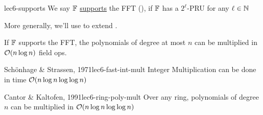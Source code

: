 \begin{definition}{}{lec6-supports}
    We say $\operatorname{\mathbb{F}}$ \ul{supports} the FFT (), if $\operatorname{\mathbb{F}}$ has a $2^\ell$-PRU for any $\ell \in \operatorname{\mathbb{N}}$
\end{definition}

More generally, we'll use  to extend .
\begin{theorem}{}{}
    If $\operatorname{\mathbb{F}}$ supports the FFT, the polynomials of degree at most $n$ can be multiplied in $\operatorname{\mathcal{O}}(n \log n)$ field ops.
\end{theorem}

\begin{theorem}{Sch\"{o}nhage \& Strassen, 1971}{lec6-fast-int-mult}
    Integer Multiplication can be done in time $\operatorname{\mathcal{O}}(n\log n \log\log n)$ 
\end{theorem}

\begin{theorem}{Cantor \& Kaltofen, 1991}{lec6-ring-poly-mult}
    Over any ring, polynomials of degree $n$ can be multiplied in $\operatorname{\mathcal{O}}(n \log n \log\log n)$
\end{theorem}

